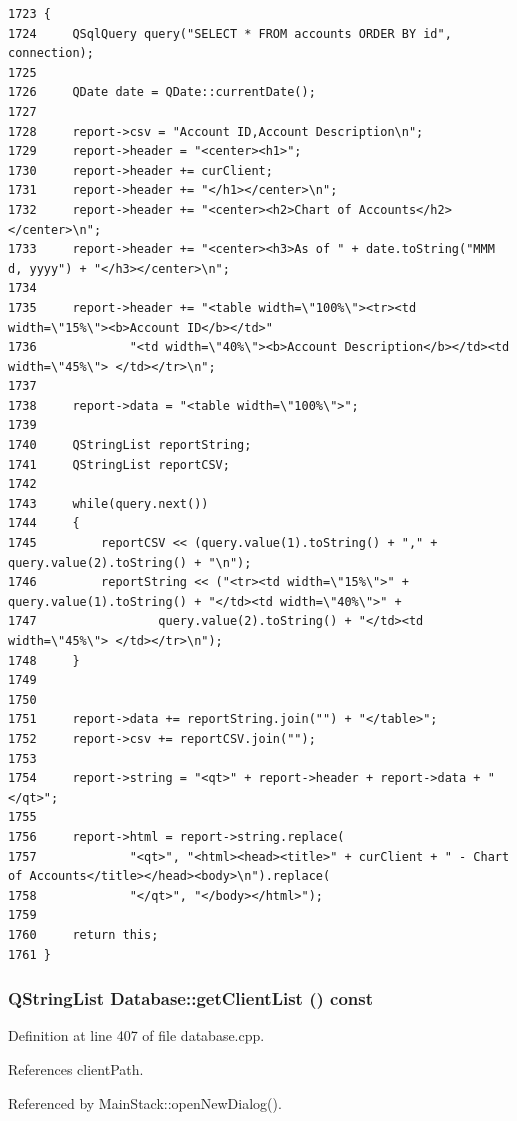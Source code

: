 \footnotesize\begin{verbatim}1723 {
1724     QSqlQuery query("SELECT * FROM accounts ORDER BY id", connection);
1725     
1726     QDate date = QDate::currentDate();
1727     
1728     report->csv = "Account ID,Account Description\n";
1729     report->header = "<center><h1>";
1730     report->header += curClient;
1731     report->header += "</h1></center>\n";
1732     report->header += "<center><h2>Chart of Accounts</h2></center>\n";
1733     report->header += "<center><h3>As of " + date.toString("MMM d, yyyy") + "</h3></center>\n";
1734 
1735     report->header += "<table width=\"100%\"><tr><td width=\"15%\"><b>Account ID</b></td>"
1736             "<td width=\"40%\"><b>Account Description</b></td><td width=\"45%\"> </td></tr>\n";
1737 
1738     report->data = "<table width=\"100%\">";
1739     
1740     QStringList reportString;
1741     QStringList reportCSV;
1742     
1743     while(query.next())
1744     {
1745         reportCSV << (query.value(1).toString() + "," + query.value(2).toString() + "\n");
1746         reportString << ("<tr><td width=\"15%\">" + query.value(1).toString() + "</td><td width=\"40%\">" +
1747                 query.value(2).toString() + "</td><td width=\"45%\"> </td></tr>\n");
1748     }
1749     
1750     
1751     report->data += reportString.join("") + "</table>";
1752     report->csv += reportCSV.join("");
1753     
1754     report->string = "<qt>" + report->header + report->data + "</qt>";
1755     
1756     report->html = report->string.replace(
1757             "<qt>", "<html><head><title>" + curClient + " - Chart of Accounts</title></head><body>\n").replace(
1758             "</qt>", "</body></html>");
1759     
1760     return this;
1761 }
\end{verbatim}\normalsize 


\hypertarget{classDatabase_a13}{
\subsubsection[getClientList]{\setlength{\rightskip}{0pt plus 5cm}QString\-List Database::get\-Client\-List () const}}
\label{classDatabase_a13}


Definition at line 407 of file database.cpp.

References client\-Path.

Referenced by Main\-Stack::open\-New\-Dialog().

